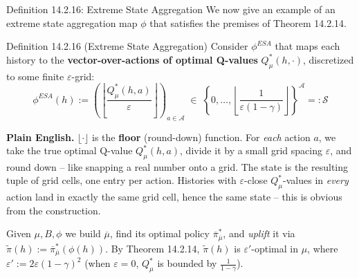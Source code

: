 \documentclass[aspectratio=169,10pt]{beamer}
\newcommand{\Sc}{\mathcal{S}}
\newcommand{\Ac}{\mathcal{A}}
\begin{document}
\begin{frame}{Definition 14.2.16: Extreme State Aggregation}
  We now give an example of an extreme state aggregation map $\phi$ that
  satisfies the premises of Theorem 14.2.14.
  \begin{block}{Definition 14.2.16 (Extreme State Aggregation)}
    Consider $\phi^{ESA}$ that maps each history to the
    \textbf{vector-over-actions of optimal Q-values} $Q^*_\mu(h,\cdot)$,
    discretized to some finite $\varepsilon$-grid:
    \[
      \phi^{ESA}(h) := \left(\left\lfloor \frac{Q^*_\mu(h,a)}{\varepsilon}\right\rfloor\right)_{a\in\Ac}
      \;\in\; \left\{0,\ldots,\left\lfloor\frac{1}{\varepsilon(1-\gamma)}\right\rfloor\right\}^{\Ac} =: \Sc
    \]
  \end{block}
  \textbf{Plain English.} $\lfloor\cdot\rfloor$ is the \textbf{floor}
  (round-down) function. For \emph{each} action $a$, we take the true
  optimal Q-value $Q^*_\mu(h,a)$, divide it by a small grid spacing
  $\varepsilon$, and round down -- like snapping a real number onto a
  grid. The state is the resulting tuple of grid cells, one entry per
  action. Histories with $\varepsilon$-close $Q^*_\mu$-values in
  \emph{every} action land in exactly the same grid cell, hence the same
  state -- this is obvious from the construction.

  \vspace{0.4em}
  Given $\mu,B,\phi$ we build $\overline\mu$, find its optimal policy
  $\overline\pi^*_{\overline\mu}$, and \emph{uplift} it via
  $\tilde\pi(h):=\overline\pi^*_{\overline\mu}(\phi(h))$. By Theorem
  14.2.14, $\tilde\pi(h)$ is $\varepsilon'$-optimal in $\mu$, where
  $\varepsilon':=2\varepsilon(1-\gamma)^2$ (when $\varepsilon=0$, $Q^*_\mu$
  is bounded by $\frac{1}{1-\gamma}$).
\end{frame}
\end{document}
